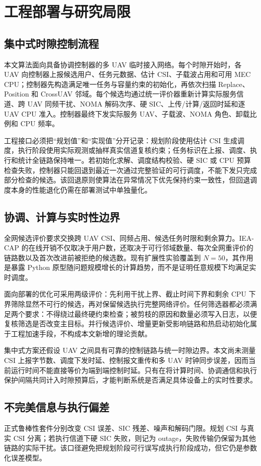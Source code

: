 \chapter{工程部署与研究局限}

\section{集中式时隙控制流程}
本文算法面向具备协调控制器的多 UAV 临时接入网络。每个时隙开始时，各 UAV 向控制器上报候选用户、任务元数据、估计 CSI、子载波占用和可用 MEC CPU；控制器先构造满足唯一任务与容量约束的初始化，再依次扫描 Replace、Position 和 CrossUAV 邻域。每个候选均通过统一评价器重新计算实际服务信道、跨 UAV 同频干扰、NOMA 解码次序、硬 SIC、上传/计算/返回时延和逐 UAV CPU 准入。控制器最终下发实际服务 UAV、子载波、NOMA 角色、卸载比例和 CPU 频率。

工程接口必须把“规划值”和“实现值”分开记录：规划阶段使用估计 CSI 生成调度，执行阶段使用实际观测或抽样真实信道复核约束；任务标识在上报、调度、执行和统计全链路保持唯一。若初始化求解、调度结构校验、硬 SIC 或 CPU 预算检查失败，控制器只能回退到最近一次通过完整验证的可行调度，不能下发只完成部分检查的候选。该回退原则使算法在异常情况下优先保持约束一致性，但回退调度本身的性能退化仍需在部署测试中单独量化。

\section{协调、计算与实时性边界}
全网候选评价要求交换跨 UAV CSI、同频占用、候选任务时限和剩余算力。IEA-CAP 的在线开销不仅取决于用户数，还取决于可行邻域数量、每次全网重评价的链路数以及首次改进前被拒绝的候选数。现有扩展性实验覆盖到 $N=50$，其作用是暴露 Python 原型随问题规模增长的计算趋势，而不是证明任意规模下均满足实时调度。

面向部署的优化可采用两级评价：先利用干扰上界、截止时间下界和剩余 CPU 下界筛除显然不可行的候选，再对保留候选执行完整网络评价。任何筛选器都必须满足两个要求：不得绕过最终硬约束检查；被剪枝的原因和数量必须写入日志，以便复核筛选是否改变主目标。并行候选评价、增量更新受影响链路和热启动初始化属于工程加速手段，不构成本文新增的理论贡献。

集中式方案还假设 UAV 之间具有可靠的控制链路与统一时隙边界。本文尚未测量 CSI 上报字节数、调度下发时延、控制报文重传和多 UAV 时钟同步误差，因而当前运行时间不能直接等价为端到端控制时延。只有在将计算时间、协调通信和执行保护间隔共同计入时隙预算后，才能判断系统是否满足具体设备上的实时性要求。

\section{不完美信息与执行偏差}
正式鲁棒性套件分别改变 CSI 误差、SIC 残差、噪声和解码门限。规划 CSI 与真实 CSI 分离；若执行信道下硬 SIC 失败，则记为 outage，失败传输仍保留为其他链路的实际干扰。该口径避免把规划阶段可行误写成执行阶段成功，但它仍是参数化误差模型。

